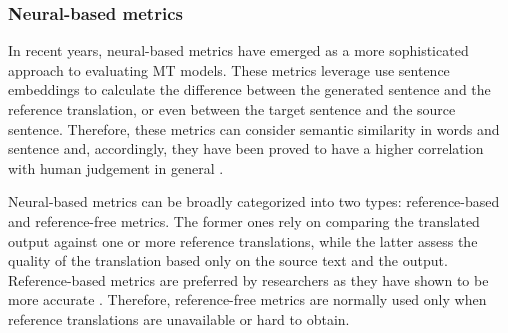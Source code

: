 \documentclass[11pt,english,listoffigures,listoftables]{tfgetsinf}
\begin{document}

\subsubsection{Neural-based metrics}

In recent years, neural-based metrics have emerged as a more sophisticated approach to evaluating MT models. These metrics leverage use sentence embeddings to calculate the difference between the generated sentence and the reference translation, or even between the target sentence and the source sentence. Therefore, these metrics can consider semantic similarity in words and sentence and, accordingly, they have been proved to have a higher correlation with human judgement in general \cite{kocmi-etal-2021-ship} \cite{freitag-etal-wmt22}. 

Neural-based metrics can be broadly categorized into two types: reference-based and reference-free metrics. The former ones rely on comparing the translated output against one or more reference translations, while the latter assess the quality of the translation based only on the source text and the output. Reference-based metrics are preferred by researchers as they have shown to be more accurate \cite{freitag-etal-wmt22}. Therefore, reference-free metrics are normally used only when reference translations are unavailable or hard to obtain. 
\end{document}
